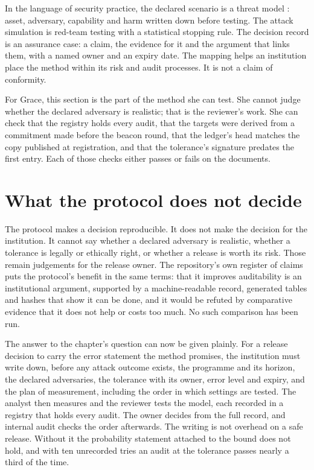 In the language of security practice, the declared scenario is a threat model
\citep{shostack2014}: asset, adversary, capability and harm written down before
testing. The attack simulation is red-team testing with a statistical stopping rule.
The decision record is an assurance case: a claim, the evidence for it and the
argument that links them, with a named owner and an expiry date. The mapping helps an
institution place the method within its risk and audit processes. It is not a claim
of conformity.

For Grace, this section is the part of the method she can test. She cannot judge
whether the declared adversary is realistic; that is the reviewer's work. She can
check that the registry holds every audit, that the targets were derived from a
commitment made before the beacon round, that the ledger's head matches the copy
published at registration, and that the tolerance's signature predates the first
entry. Each of those checks either passes or fails on the documents.

\section{What the protocol does not decide}

The protocol makes a decision reproducible. It does not make the decision for the
institution. It cannot say whether a declared adversary is realistic, whether a
tolerance is legally or ethically right, or whether a release is worth its risk.
Those remain judgements for the release owner. The repository's own register of
claims puts the protocol's benefit in the same terms: that it improves auditability is
an institutional argument, supported by a machine-readable record, generated tables
and hashes that show it can be done, and it would be refuted by comparative evidence
that it does not help or costs too much. %
No such comparison has been run.

The answer to the chapter's question can now be given plainly. For a release
decision to carry the error statement the method promises, the institution must
write down, before any attack outcome exists, the programme and its horizon, the
declared adversaries, the tolerance with its owner, error level and expiry, and the
plan of measurement, including the order in which settings are tested. The analyst
then measures and the reviewer tests the model, each recorded in a registry that
holds every audit. The owner decides from the full record, and internal audit checks
the order afterwards. The writing is not overhead on a safe release. Without it the
probability statement attached to the bound does not hold, and with ten unrecorded
tries an audit at the tolerance passes nearly a third of the time.

